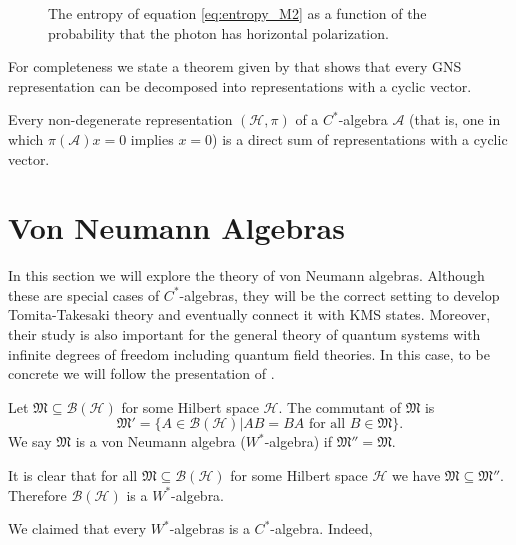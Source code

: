 \begin{example}
\begin{figure}
\caption{The entropy of equation \ref{eq:entropy_M2} as a function of the probability that the photon has horizontal polarization.}
\end{figure}
\end{example}

For completeness we state a theorem given by \cite{Bratelli1997} that shows that every GNS representation can be decomposed into representations with a cyclic vector.

\begin{theorem}
Every non-degenerate representation $(\mathcal{H},\pi)$ of a $C^*$-algebra $\mathcal{A}$ (that is, one in which $\pi(\mathcal{A})x={0}$ implies $x=0$) is a direct sum of representations with a cyclic vector. 
\end{theorem}

\section{Von Neumann Algebras}

In this section we will explore the theory of von Neumann algebras. Although these are special cases of $C^*$-algebras, they will be the correct setting to develop Tomita-Takesaki theory and eventually connect it with KMS states. Moreover, their study is also important for the general theory of quantum systems with infinite degrees of freedom including quantum field theories\cite{Haag1992}. In this case, to be concrete we will follow the presentation of \cite{ Evans1998}. 

\begin{definition}
Let $\mathfrak{M}\subseteq \mathcal{B}({\mathcal{H}})$ for some Hilbert space $\mathcal{H}$. The commutant of $\mathfrak{M}$ is
\begin{equation}
\mathfrak{M}'=\{A\in\mathcal{B}(\mathcal{H})|AB=BA\text{ for all } B\in\mathfrak{M}\}.
\end{equation}
We say $\mathfrak{M}$ is a von Neumann algebra ($W^*$-algebra) if $\mathfrak{M}''=\mathfrak{M}$.
\end{definition}

\begin{example}
It is clear that for all $\mathfrak{M}\subseteq\mathcal{B}(\mathcal{H})$ for some Hilbert space $\mathcal{H}$ we have $\mathfrak{M}\subseteq\mathfrak{M}''$. Therefore $\mathcal{B}(\mathcal{H})$ is a $W^*$-algebra.
\end{example}

We claimed that every $W^*$-algebras is a $C^*$-algebra. Indeed,

